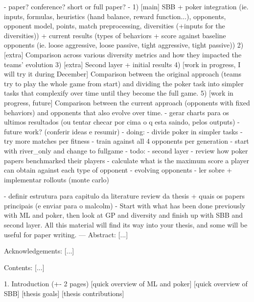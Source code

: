 - paper? conference? short or full paper?
    - 1) [main] SBB + poker integration (ie. inputs, formulas, heuristics (hand balance, reward function...), opponents, opponent model, points, match preprocessing, diversities (+inputs for the diversities)) + current results (types of behaviors + score against baseline opponents (ie. loose aggressive, loose passive, tight aggressive, tight passive))
    2) [extra] Comparison across various diversity metrics and how they impacted the teams' evolution
    3) [extra] Second layer + initial results
    4) [work in progress, I will try it during December] Comparison between the original approach (teams try to play the whole game from start) and dividing the poker task into simpler tasks that complexify over time until they become the full game.
    5) [work in progress, future] Comparison between the current approach (opponents with fixed behaviors) and opponents that also evolve over time.
- gerar charts para os ultimos resultados (ou tentar checar por cima o q esta saindo, pelos outputs)
- future work? (conferir ideas e resumir)
    - doing:
        - divide poker in simpler tasks
        - try more matches per fitness
        - train against all 4 opponents per generation
        - start with river_only and change to fullgame
    - todo:
        - second layer
        - review how poker papers benchmarked their players
        - calculate what is the maximum score a player can obtain against each type of opponent
        - evolving opponents
        - ler sobre + implementar rollouts (monte carlo)



- definir estrutura para capitulo da literature review da thesis + quais os papers principais (e enviar para o malcolm)
    - Start with what has been done previously with ML and poker, then look at GP and diversity and finish up with SBB and second layer. All this material will find its way into your thesis, and some will be useful for paper writing.
---
Abstract:
[...]

Acknowledgements:
[...]

Contents:
[...]

1. Introduction (+- 2 pages)
    [quick overview of ML and poker]
    [quick overview of SBB]
    [thesis goals]
    [thesis contributions]

